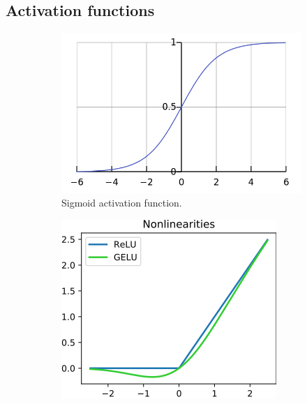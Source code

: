 \subsection{Activation functions}
\label{appendix:activations}




\begin{figure}
    \centering
    \begin{subfigure}[b]{0.4\textwidth}   
        \centering 
        \includegraphics[width=\textwidth]{images/appendix/activations/sigmoid.png}
        \caption[]%
        {{\small Sigmoid activation function.}}    
        \label{fig:appendix_activations_sigmoid}
    \end{subfigure}
    \hfill
    \begin{subfigure}[b]{0.4\textwidth}
        \centering
        \includegraphics[width=\textwidth]{images/appendix/activations/ReLU_and_GELU.png}

\end{subfigure}
\end{figure}
